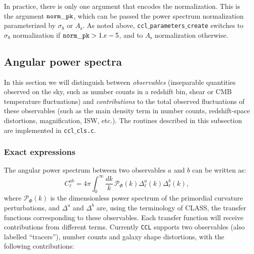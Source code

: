 \documentclass[\docopts]{\docclass}
\begin{document}
In practice, there is only one argument that encodes the normalization. This is the argument ${\tt norm\_pk}$, which can be passed the power spectrum normalization parameterized by $\sigma_8$ or $A_\mathrm{s}$. As noted above, {\tt ccl$\_$parameters$\_$create} switches to $\sigma_8$ normalization if ${\tt norm\_pk} > 1.e-5$, and to $A_{\mathrm s}$ normalization otherwise.

\subsection{Angular power spectra}
\label{sec:cl}

In this section we will distinguish between {\sl observables} (inseparable quantities observed on the sky, such as number counts in a redshift bin, shear or CMB temperature fluctuations) and {\sl contributions} to the total observed fluctuations of these observables (such as the main density term in number counts, redshift-space distortions, magnification, ISW, etc.).
The routines described in this subsection are implemented in {\tt ccl$\_$cls.c}.

\subsubsection{Exact expressions}
The angular power spectrum between two observables $a$ and $b$ can be written as:
\begin{equation}
 C^{ab}_\ell=4\pi\int_0^\infty \frac{dk}{k}\,\mathcal{P}_\Phi(k)\Delta^a_\ell(k)\Delta^b_\ell(k),
\end{equation}
where $\mathcal{P}_\Phi(k)$ is the dimensionless power spectrum of the primordial curvature perturbations, and $\Delta^a$ and $\Delta^b$ are, using the terminology of CLASS, the transfer functions corresponding to these observables. Each transfer function will receive contributions from different terms. Currently {\tt CCL} supports two observables (also labelled ``tracers''), number counts and galaxy shape distortions, with the following contributions:
\end{document}
